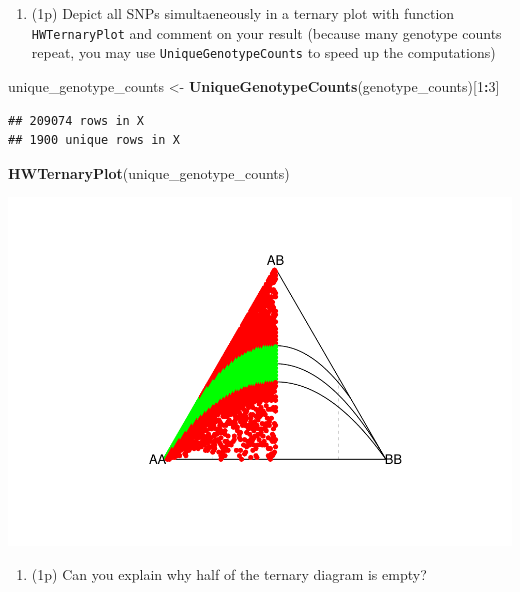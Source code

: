 \documentclass[
]{article}
\newenvironment{Shaded}{\begin{snugshade}}{\end{snugshade}}
\newcommand{\DecValTok}[1]{\textcolor[rgb]{0.00,0.00,0.81}{#1}}
\newcommand{\KeywordTok}[1]{\textcolor[rgb]{0.13,0.29,0.53}{\textbf{#1}}}
\newcommand{\NormalTok}[1]{#1}
\newcommand{\OperatorTok}[1]{\textcolor[rgb]{0.81,0.36,0.00}{\textbf{#1}}}
\newcommand{\StringTok}[1]{\textcolor[rgb]{0.31,0.60,0.02}{#1}}
\providecommand{\tightlist}{%
  \setlength{\itemsep}{0pt}\setlength{\parskip}{0pt}}
\begin{document}
\begin{enumerate}
\def\labelenumi{\arabic{enumi}.}
\setcounter{enumi}{11}
\tightlist
\item
  (1p) Depict all SNPs simultaeneously in a ternary plot with function
  \texttt{HWTernaryPlot} and comment on your result (because many
  genotype counts repeat, you may use \texttt{UniqueGenotypeCounts} to
  speed up the computations)
\end{enumerate}

\begin{Shaded}
\begin{Highlighting}[]
\NormalTok{unique_genotype_counts <-}\StringTok{ }\KeywordTok{UniqueGenotypeCounts}\NormalTok{(genotype_counts)[}\DecValTok{1}\OperatorTok{:}\DecValTok{3}\NormalTok{]}
\end{Highlighting}
\end{Shaded}

\begin{verbatim}
## 209074 rows in X
## 1900 unique rows in X
\end{verbatim}

\begin{Shaded}
\begin{Highlighting}[]
\KeywordTok{HWTernaryPlot}\NormalTok{(unique_genotype_counts)}
\end{Highlighting}
\end{Shaded}

\includegraphics{P022020_HWE_files/figure-latex/12th-1.pdf}

\begin{enumerate}
\def\labelenumi{\arabic{enumi}.}
\setcounter{enumi}{12}
\tightlist
\item
  (1p) Can you explain why half of the ternary diagram is empty?
\end{enumerate}
\end{document}
